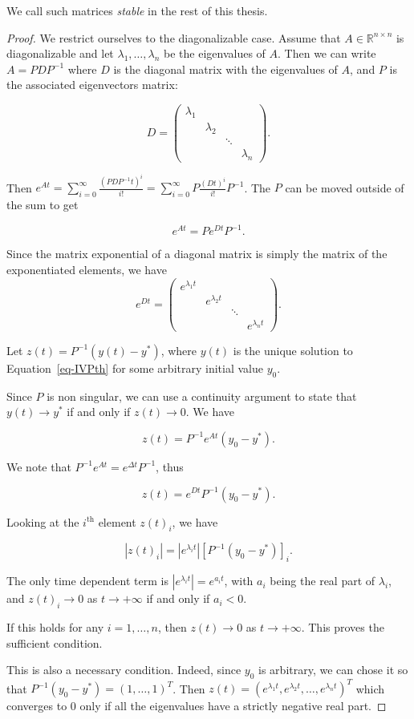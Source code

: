 \documentclass[
  letterpaper,
]{report}
\theoremstyle{definition}
\theoremstyle{plain}
\theoremstyle{definition}
\theoremstyle{remark}
\begin{document}
We call such matrices \emph{stable} in the rest of this thesis.

\begin{proof}
We restrict ourselves to the diagonalizable case. Assume that
\(A\in\mathbb{R}^{n\times n}\) is diagonalizable and let
\(\lambda_1,\dots,\lambda_n\) be the eigenvalues of \(A\). Then we can
write \(A = PD P^{-1}\) where \(D\) is the diagonal matrix with the
eigenvalues of \(A\), and \(P\) is the associated eigenvectors matrix:

\[
D = \begin{pmatrix}   
\lambda_1 & & &\\
&\lambda_2 & &  \\
&& \ddots & \\
&&& \lambda_n 
\end{pmatrix}.
\]

Then
\(e^{At} = \sum_{i=0}^\infty \frac{(PD P^{-1}t)^i}{i!} = \sum_{i=0}^\infty P \frac{(D t)^i}{i!}P^{-1}\).
The \(P\) can be moved outside of the sum to get

\[
e^{At} = P e^{D t}P^{-1}.
\]

Since the matrix exponential of a diagonal matrix is simply the matrix
of the exponentiated elements, we have \[
e^{D t} = \begin{pmatrix}   
e^{\lambda_1 t} & & &\\
&e^{\lambda_2 t} & &  \\
&& \ddots & \\
&&& e^{\lambda_n t}
\end{pmatrix}.
\]

Let \(z(t) = P^{-1}(y(t)-y^*)\), where \(y(t)\) is the unique solution
to Equation~\ref{eq-IVPth} for some arbitrary initial value \(y_0\).

Since \(P\) is non singular, we can use a continuity argument to state
that \(y(t) \to y^*\) if and only if \(z(t) \to 0\). We have

\[
z(t) = P^{-1} e^{At}(y_0-y^*).
\]

We note that \(P^{-1} e^{At} = e^{\Delta t} P^{-1}\), thus

\[
z(t) = e^{D t} P^{-1}(y_0-y^*).
\]

Looking at the \(i^{\text{th}}\) element \(z(t)_i\), we have

\[
|z(t)_i| = |e^{\lambda_i t}|\left[ P^{-1}(y_0-y^*)\right]_i.
\]

The only time dependent term is \(|e^{\lambda_i t}| = e^{a_it}\), with
\(a_i\) being the real part of \(\lambda_i\), and \(z(t)_i \to 0\) as
\(t \to +\infty\) if and only if \(a_i<0\).

If this holds for any \(i = 1, \dots , n\), then \(z(t) \to 0\) as
\(t\to +\infty\). This proves the sufficient condition.

This is also a necessary condition. Indeed, since \(y_0\) is arbitrary,
we can chose it so that \(P^{-1}(y_0-y^*) = (1, \dots , 1)^T\). Then
\(z(t) = (e^{\lambda_1 t}, e^{\lambda_2 t}, \dots , e^{\lambda_n t})^T\)
which converges to \(0\) only if all the eigenvalues have a strictly
negative real part.
\end{proof}
\end{document}
